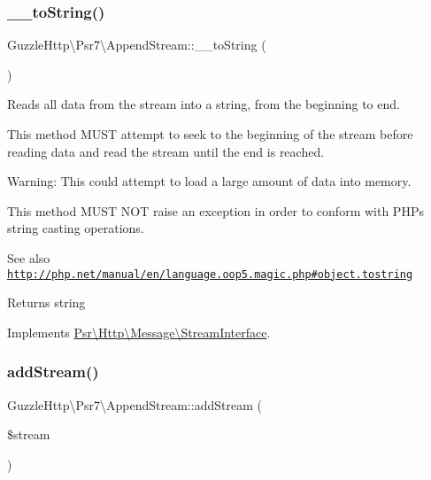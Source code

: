 \subsubsection{\texorpdfstring{\+\_\+\+\_\+to\+String()}{\_\_toString()}}
{\footnotesize\ttfamily Guzzle\+Http\textbackslash{}\+Psr7\textbackslash{}\+Append\+Stream\+::\+\_\+\+\_\+to\+String (\begin{DoxyParamCaption}{ }\end{DoxyParamCaption})}

Reads all data from the stream into a string, from the beginning to end.

This method M\+U\+ST attempt to seek to the beginning of the stream before reading data and read the stream until the end is reached.

Warning\+: This could attempt to load a large amount of data into memory.

This method M\+U\+ST N\+OT raise an exception in order to conform with P\+HP\textquotesingle{}s string casting operations.

\begin{DoxySeeAlso}{See also}
\href{http://php.net/manual/en/language.oop5.magic.php#object.tostring}{\tt http\+://php.\+net/manual/en/language.\+oop5.\+magic.\+php\#object.\+tostring} 
\end{DoxySeeAlso}
\begin{DoxyReturn}{Returns}
string 
\end{DoxyReturn}


Implements \hyperlink{interfacePsr_1_1Http_1_1Message_1_1StreamInterface_a72df4e8851ae1a81087f3415fd6d73cd}{Psr\textbackslash{}\+Http\textbackslash{}\+Message\textbackslash{}\+Stream\+Interface}.

\mbox{\label{classGuzzleHttp_1_1Psr7_1_1AppendStream_a77881cb83e432589325ca0cec8e88036}} 
\subsubsection{\texorpdfstring{add\+Stream()}{addStream()}}
{\footnotesize\ttfamily Guzzle\+Http\textbackslash{}\+Psr7\textbackslash{}\+Append\+Stream\+::add\+Stream (\begin{DoxyParamCaption}\item[{\hyperlink{interfacePsr_1_1Http_1_1Message_1_1StreamInterface}{Stream\+Interface}}]{\$stream }\end{DoxyParamCaption})}


